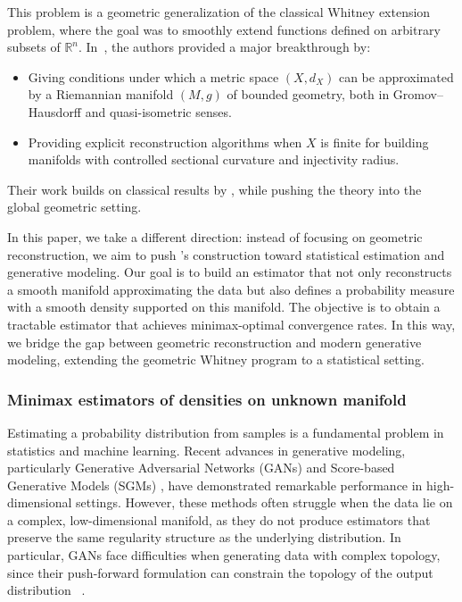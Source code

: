 \documentclass[10pt]{article}
\begin{document}
This problem is a geometric generalization of the classical Whitney extension problem, where the goal was to smoothly extend functions defined on arbitrary subsets of \( \mathbb{R}^n \).
In~\cite{fefferman2015reconstruction}, the authors provided a major breakthrough by:
\begin{itemize}
    \item Giving  conditions under which a metric space \( (X, d_X) \) can be approximated by a Riemannian manifold \( (M, g) \) of bounded geometry, both in Gromov--Hausdorff and quasi-isometric senses.
    \item Providing explicit reconstruction algorithms when $X$ is finite for building manifolds with controlled sectional curvature and injectivity radius.
\end{itemize}

Their work builds on classical results by  \citep{whitney1992functions,glaeser1958etude,brudnyi1997whitney,bierstone2003diff}, while pushing the theory into the global geometric setting.

In this paper, we take a different direction: instead of focusing on geometric reconstruction, we aim to push \cite{fefferman2015reconstruction}'s construction toward statistical estimation and generative modeling. Our goal is to build an estimator that not only reconstructs a smooth manifold approximating the data but also defines a probability measure with a smooth density supported on this manifold. The objective is to obtain a tractable estimator that achieves minimax-optimal convergence rates. In this way, we bridge the gap between geometric reconstruction and modern generative modeling, extending the geometric Whitney program to a statistical setting.



\subsubsection{Minimax estimators of densities on unknown manifold}
Estimating a probability distribution from samples is a fundamental problem in statistics and machine learning. Recent advances in generative modeling, particularly Generative Adversarial Networks (GANs)  \cite{goodfellow2014generative}  and Score-based Generative Models (SGMs) \cite{song2020score}, have demonstrated remarkable performance in high-dimensional settings. However, these methods often struggle when the data lie on a complex, low-dimensional manifold, as they do not produce estimators that preserve the same regularity structure as the underlying distribution. In particular, GANs face difficulties when generating data with complex topology, since their push-forward formulation can constrain the topology of the output distribution ~\citep{tanielian2020learning,stephanovitch2023wasserstein}.
\end{document}
